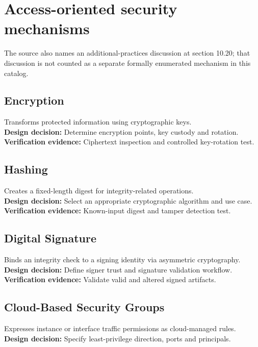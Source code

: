 \documentclass[10pt,letterpaper]{article}
\begin{document}
\section{Access-oriented security mechanisms}
The source also names an additional-practices discussion at section 10.20; that discussion is not counted as a separate formally enumerated mechanism in this catalog.
\subsection{Encryption}
Transforms protected information using cryptographic keys.\\[4pt]
\textbf{Design decision:} Determine encryption points, key custody and rotation.\\[3pt]
\textbf{Verification evidence:} Ciphertext inspection and controlled key-rotation test.\\[3pt]
\subsection{Hashing}
Creates a fixed-length digest for integrity-related operations.\\[4pt]
\textbf{Design decision:} Select an appropriate cryptographic algorithm and use case.\\[3pt]
\textbf{Verification evidence:} Known-input digest and tamper detection test.\\[3pt]
\subsection{Digital Signature}
Binds an integrity check to a signing identity via asymmetric cryptography.\\[4pt]
\textbf{Design decision:} Define signer trust and signature validation workflow.\\[3pt]
\textbf{Verification evidence:} Validate valid and altered signed artifacts.\\[3pt]
\subsection{Cloud-Based Security Groups}
Expresses instance or interface traffic permissions as cloud-managed rules.\\[4pt]
\textbf{Design decision:} Specify least-privilege direction, ports and principals.\\[3pt]
\end{document}
